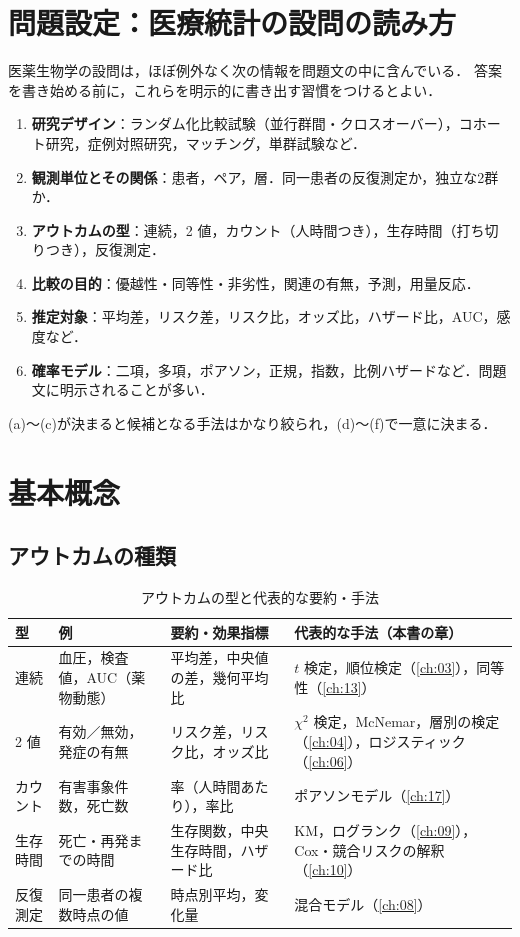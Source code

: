 \documentclass[a4paper,11pt,openany]{ltjsbook}
\begin{document}
\section{問題設定：医療統計の設問の読み方}\label{sec:01-read}
医薬生物学の設問は，ほぼ例外なく次の情報を問題文の中に含んでいる．
答案を書き始める前に，これらを明示的に書き出す習慣をつけるとよい．
\begin{enumerate}[label=(\alph*)]
\item \textbf{研究デザイン}：ランダム化比較試験（並行群間・クロスオーバー），コホート研究，症例対照研究，マッチング，単群試験など．
\item \textbf{観測単位とその関係}：患者，ペア，層．同一患者の反復測定か，独立な2群か．
\item \textbf{アウトカムの型}：連続，2 値，カウント（人時間つき），生存時間（打ち切りつき），反復測定．
\item \textbf{比較の目的}：優越性・同等性・非劣性，関連の有無，予測，用量反応．
\item \textbf{推定対象}：平均差，リスク差，リスク比，オッズ比，ハザード比，AUC，感度など．
\item \textbf{確率モデル}：二項，多項，ポアソン，正規，指数，比例ハザードなど．問題文に明示されることが多い．
\end{enumerate}
(a)〜(c)が決まると候補となる手法はかなり絞られ，(d)〜(f)で一意に決まる．

\section{基本概念}\label{sec:01-basic}
\subsection{アウトカムの種類}\label{subsec:01-outcome}
\begin{table}[htbp]
\centering\small
\caption{アウトカムの型と代表的な要約・手法}\label{tab:01-outcome}
\begin{tabular}{@{}lL{35mm}L{35mm}L{45mm}@{}}
\toprule
型 & 例 & 要約・効果指標 & 代表的な手法（本書の章）\\
\midrule
連続 & 血圧，検査値，AUC（薬物動態） & 平均差，中央値の差，幾何平均比 & $t$ 検定，順位検定（\ref{ch:03}），同等性（\ref{ch:13}）\\
2 値 & 有効／無効，発症の有無 & リスク差，リスク比，オッズ比 & $\chi^2$ 検定，McNemar，層別の検定（\ref{ch:04}），ロジスティック（\ref{ch:06}）\\
カウント & 有害事象件数，死亡数 & 率（人時間あたり），率比 & ポアソンモデル（\ref{ch:17}）\\
生存時間 & 死亡・再発までの時間 & 生存関数，中央生存時間，ハザード比 & KM，ログランク（\ref{ch:09}），Cox・競合リスクの解釈（\ref{ch:10}）\\
反復測定 & 同一患者の複数時点の値 & 時点別平均，変化量 & 混合モデル（\ref{ch:08}）\\
\bottomrule
\end{tabular}
\end{table}
\end{document}
